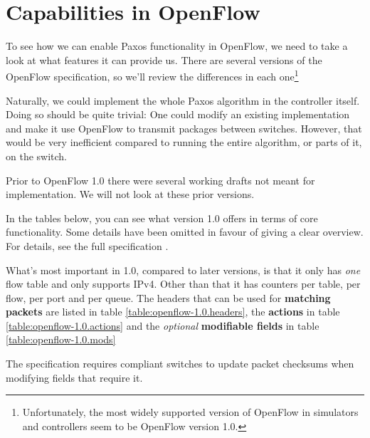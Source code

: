 \section{Capabilities in OpenFlow}
\label{chapter:details.openflow}


To see how we can enable Paxos functionality in OpenFlow, we need to take a
look at what features it can provide us.  There are several versions of the
OpenFlow specification, so we'll review the differences in each
one\footnote{Unfortunately, the most widely supported version of OpenFlow in
simulators and controllers seem to be OpenFlow version 1.0.}

Naturally, we could implement the whole Paxos algorithm in the controller
itself.  Doing so should be quite trivial: One could modify an existing
implementation and make it use OpenFlow to transmit packages between
switches.  However, that would be very inefficient compared to running the
entire algorithm, or parts of it, on the switch.

Prior to OpenFlow 1.0 \cite{openflow-1.0} there were several working
drafts not meant for implementation.  We will not look at these prior
versions.

In the tables below, you can see what version 1.0 offers in terms of core
functionality.  Some details have been omitted in favour of giving a clear
overview.  For details, see the full specification \cite{openflow-1.0}.

What's most important in 1.0, compared to later versions, is that it only
has {\em one} flow table and only supports IPv4.  Other than that it has
counters per table, per flow, per port and per queue.  The headers that can
be used for \textbf{matching packets} are listed in table
\ref{table:openflow-1.0.headers}, the \textbf{actions} in table
\ref{table:openflow-1.0.actions} and the {\em optional} \textbf{modifiable
  fields} in table \ref{table:openflow-1.0.mods}

The specification requires compliant switches to update packet checksums
when modifying fields that require it.

